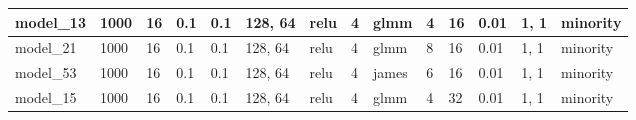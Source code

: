 \begin{tabular}{|l|l|l|l|l|l|l|l|l|l|l|l|l|l|}
model\_13      & 1000           & 16           & 0.1          & 0.1          & 128, 64     & relu         & 4           & glmm              & 4                    & 16                    & 0.01                       & 1, 1             & minority                    \\ \hline
model\_21      & 1000           & 16           & 0.1          & 0.1          & 128, 64     & relu         & 4           & glmm              & 8                    & 16                    & 0.01                       & 1, 1             & minority                    \\ \hline
model\_53      & 1000           & 16           & 0.1          & 0.1          & 128, 64     & relu         & 4           & james             & 6                    & 16                    & 0.01                       & 1, 1             & minority                    \\ \hline
model\_15      & 1000           & 16           & 0.1          & 0.1          & 128, 64     & relu         & 4           & glmm              & 4                    & 32                    & 0.01                       & 1, 1             & minority                    \\ \hline
\end{tabular}